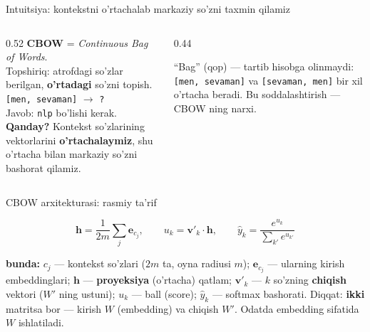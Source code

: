 \documentclass[aspectratio=169,11pt]{beamer}
\newcommand{\bunda}[1]{{\small\textbf{bunda:}\; #1}}
\begin{document}
\begin{frame}{Intuitsiya: kontekstni o'rtachalab markaziy so'zni taxmin qilamiz}
  \begin{columns}[T]
    \begin{column}{0.52\textwidth}
      \small
      \textbf{CBOW} = \textit{Continuous Bag of Words}.\\[4pt]
      Topshiriq: atrofdagi so'zlar berilgan, \textbf{o'rtadagi} so'zni topish.\\[5pt]
      \texttt{[men, sevaman]} $\to$ \texttt{?}\\[3pt]
      Javob: \texttt{nlp} bo'lishi kerak.\\[6pt]
      \textbf{Qanday?} Kontekst so'zlarining vektorlarini \textbf{o'rtachalaymiz},
      shu o'rtacha bilan markaziy so'zni bashorat qilamiz.
    \end{column}
    \begin{column}{0.44\textwidth}
      \begin{tcolorbox}[okbox,top=2pt,bottom=2pt]
        \footnotesize
        ``Bag'' (qop) --- tartib hisobga olinmaydi: \texttt{[men, sevaman]} va
        \texttt{[sevaman, men]} bir xil o'rtacha beradi. Bu soddalashtirish ---
        CBOW ning narxi.
      \end{tcolorbox}
    \end{column}
  \end{columns}
\end{frame}

\begin{frame}{CBOW arxitekturasi: rasmiy ta'rif}
  \begin{tcolorbox}[defbox,title=Ta'rif: CBOW oldinga yo'nalishi (forward)]
    \vspace{-0.4em}
    $$ \mathbf{h} = \frac{1}{2m}\sum_{j} \mathbf{e}_{c_j}, \qquad
       u_k = \mathbf{v}'_k \cdot \mathbf{h}, \qquad
       \hat{y}_k = \frac{e^{u_k}}{\sum_{k'} e^{u_{k'}}} $$
  \end{tcolorbox}
  \vspace{2pt}
  \bunda{$c_j$ --- kontekst so'zlari ($2m$ ta, oyna radiusi $m$);
  $\mathbf{e}_{c_j}$ --- ularning kirish embeddinglari; $\mathbf{h}$ ---
  \textbf{proyeksiya} (o'rtacha) qatlam; $\mathbf{v}'_k$ --- $k$ so'zning
  \textbf{chiqish} vektori ($W'$ ning ustuni); $u_k$ --- ball (score);
  $\hat{y}_k$ --- softmax bashorati.}
  \vspace{4pt}
  \footnotesize Diqqat: \textbf{ikki} matritsa bor --- kirish $W$ (embedding) va
  chiqish $W'$. Odatda embedding sifatida $W$ ishlatiladi.
\end{frame}
\end{document}
